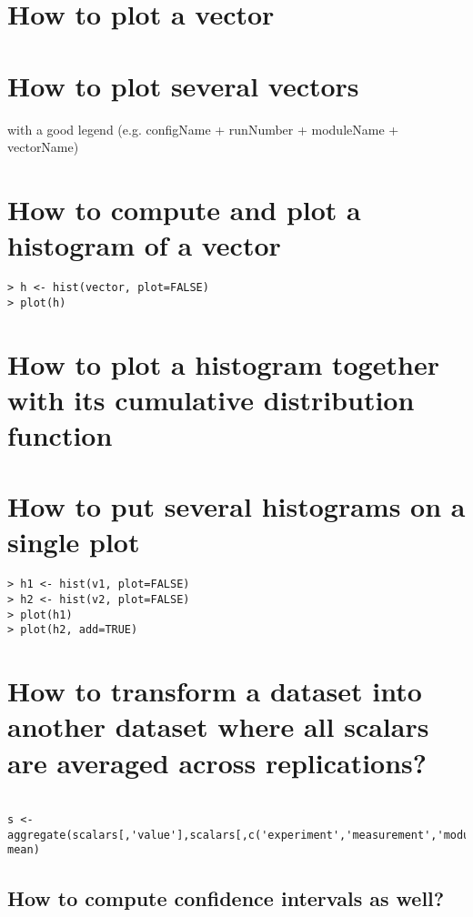
\section{How to plot a vector}

\section{How to plot several vectors}

with a good legend (e.g. configName + runNumber + moduleName + vectorName)

\section{How to compute and plot a histogram of a vector}

\begin{verbatim}
> h <- hist(vector, plot=FALSE)
> plot(h)
\end{verbatim}

\section{How to plot a histogram together with its cumulative distribution
function}

\section{How to put several histograms on a single plot}

\begin{verbatim}
> h1 <- hist(v1, plot=FALSE)
> h2 <- hist(v2, plot=FALSE)
> plot(h1)
> plot(h2, add=TRUE)
\end{verbatim}

\section{How to transform a dataset into another dataset where all scalars are
averaged across replications?}

\begin{verbatim}

s <- aggregate(scalars[,'value'],scalars[,c('experiment','measurement','module','name')], mean)
\end{verbatim}

\subsection{How to compute confidence intervals as well?}

